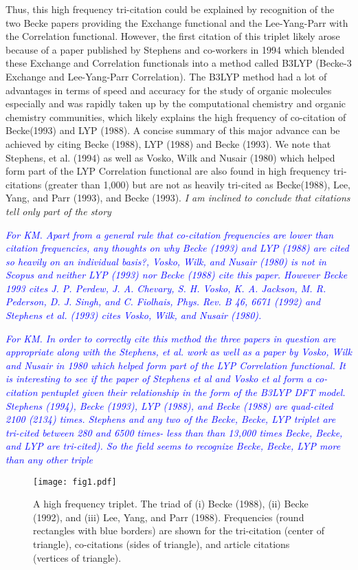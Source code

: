 \documentclass[notitlepage]{report}
\begin{document}
Thus, this high frequency tri-citation could be explained by recognition of the two Becke papers providing the Exchange functional and the Lee-Yang-Parr with the Correlation functional. 
However, the first citation of this triplet likely arose because of a paper published by Stephens and co-workers in 1994 which blended these Exchange and Correlation functionals into a method called B3LYP (Becke-3 Exchange and Lee-Yang-Parr Correlation). The B3LYP method had a lot of advantages in terms of speed and accuracy for the study of organic molecules especially and was rapidly taken up by the computational chemistry and organic chemistry communities, which likely explains the high frequency of co-citation of Becke(1993) and LYP (1988). A concise summary of this major advance can be achieved by citing Becke (1988), LYP (1988) and Becke (1993). We note that Stephens, et al. (1994) as well as Vosko, Wilk and Nusair (1980) which helped form part of the LYP Correlation functional are also found in high frequency tri-citations (greater than 1,000) but are not as heavily tri-cited as Becke(1988), Lee, Yang, and Parr (1993), and Becke (1993). \emph{I am inclined to conclude that citations tell only part of the story}

\textcolor{blue}{
\emph{For KM. Apart from a general rule that co-citation frequencies are lower than citation frequencies, any thoughts on why Becke (1993) and LYP (1988) are cited so heavily on an individual basis?, Vosko, Wilk, and Nusair (1980) is not in Scopus and neither LYP (1993) nor Becke (1988) cite this paper. However  Becke 1993 cites J. P. Perdew, J. A. Chevary, S. H. Vosko, K. A. Jackson, M. R. Pederson, D. J. Singh, and C. Fiolhais, Phys. Rev. B 46, 6671 (1992) and Stephens et al. (1993) cites Vosko, Wilk, and Nusair (1980).}}  

\textcolor{blue}{
\emph{For KM. In order to correctly cite this method the three papers in question are appropriate along with the Stephens, et al. work as well as a paper by Vosko, Wilk and Nusair in 1980 which helped form part of the LYP Correlation functional. It is interesting to see if the paper of Stephens et al and Vosko et al form a co-citation pentuplet given their relationship in the form of the B3LYP DFT model. Stephens (1994), Becke (1993), LYP (1988), and Becke (1988) are quad-cited 2100 (2134) times. Stephens and any two of the Becke, Becke, LYP triplet are tri-cited between 280 and 6500 times- less than than 13,000 times Becke, Becke, and LYP are tri-cited). So the field seems to recognize Becke, Becke, LYP more than any other triple}}

\begin{figure}[h!]
\begin{center}
\texttt{[image: fig1.pdf]}%
\end{center}
\caption{A high frequency triplet. The triad of (i) Becke (1988), (ii) Becke (1992), and (iii) Lee, Yang, and Parr (1988).  Frequencies (round rectangles with blue borders) are shown for the tri-citation (center of triangle), co-citations (sides of triangle), and 
article citations (vertices of triangle). 
}
\label{fig:fig2}
\end{figure}
\end{document}
